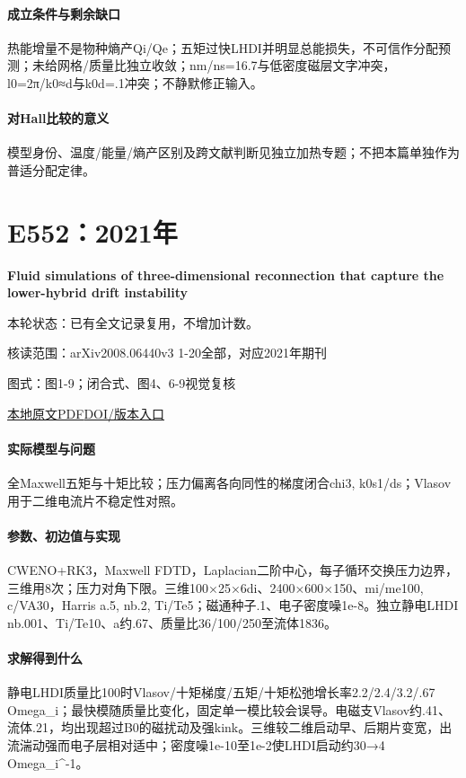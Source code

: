 \paragraph{成立条件与剩余缺口}热能增量不是物种熵产Qi/Qe；五矩过快LHDI并明显总能损失，不可信作分配预测；未给网格/质量比独立收敛；nm/ns=16.7与低密度磁层文字冲突，l0=2π/k0≈d与k0d=.1冲突；不静默修正输入。

\paragraph{对Hall比较的意义}模型身份、温度/能量/熵产区别及跨文献判断见独立加热专题；不把本篇单独作为普适分配定律。

\section{E552：2021年}\label{paper:E552}

\textbf{Fluid simulations of three-dimensional reconnection that capture the lower-hybrid drift instability}\citep{E552}

\textsf{本轮状态：}已有全文记录复用，不增加计数。

\textsf{核读范围：}arXiv2008.06440v3 1-20全部，对应2021年期刊\par\textsf{图式：}图1-9；闭合式、图4、6-9视觉复核

\href{run:../../papers/E552.pdf}{本地原文PDF}\quad\href{https://doi.org/10.1017/s0022377820001683}{DOI/版本入口}

\paragraph{实际模型与问题}全Maxwell五矩与十矩比较；压力偏离各向同性的梯度闭合chi3, k0s1/ds；Vlasov用于二维电流片不稳定性对照。

\paragraph{参数、初边值与实现}CWENO+RK3，Maxwell FDTD，Laplacian二阶中心，每子循环交换压力边界，三维用8次；压力对角下限。三维100×25×6di、2400×600×150、mi/me100, c/VA30，Harris a.5, nb.2, Ti/Te5；磁通种子.1、电子密度噪1e-8。独立静电LHDI nb.001、Ti/Te10、a约.67、质量比36/100/250至流体1836。

\paragraph{求解得到什么}静电LHDI质量比100时Vlasov/十矩梯度/五矩/十矩松弛增长率2.2/2.4/3.2/.67 Omega\_i；最快模随质量比变化，固定单一模比较会误导。电磁支Vlasov约.41、流体.21，均出现超过B0的磁扰动及强kink。三维较二维启动早、后期片变宽，出流湍动强而电子层相对适中；密度噪1e-10至1e-2使LHDI启动约30→4 Omega\_i\textasciicircum{}-1。


